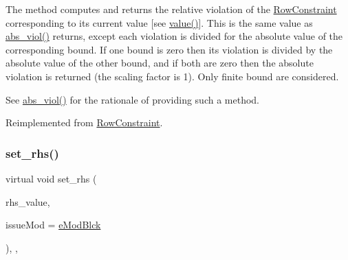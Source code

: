 The method computes and returns the relative violation of the \mbox{\hyperlink{class_s_m_spp__di__unipi__it_1_1_row_constraint}{Row\+Constraint}} corresponding to its current value \mbox{[}see \mbox{\hyperlink{class_s_m_spp__di__unipi__it_1_1_one_var_constraint_ad9256be16b98f3b557f54fa5e2118db7}{value()}}\mbox{]}. This is the same value as \mbox{\hyperlink{class_s_m_spp__di__unipi__it_1_1_u_b_constraint_a1e06e555eab5078e4d5ec16745778984}{abs\+\_\+viol()}} returns, except each violation is divided for the absolute value of the corresponding bound. If one bound is zero then its violation is divided by the absolute value of the other bound, and if both are zero then the absolute violation is returned (the scaling factor is 1). Only finite bound are considered.

See \mbox{\hyperlink{class_s_m_spp__di__unipi__it_1_1_u_b_constraint_a1e06e555eab5078e4d5ec16745778984}{abs\+\_\+viol()}} for the rationale of providing such a method. 

Reimplemented from \mbox{\hyperlink{class_s_m_spp__di__unipi__it_1_1_row_constraint_ab62e87cff922e3aa37b8a0b5644b4ecc}{Row\+Constraint}}.

\mbox{\label{class_s_m_spp__di__unipi__it_1_1_u_b_constraint_aaa68803a805a1bdf232c50aa56bb0807}} 
\subsubsection{\texorpdfstring{set\+\_\+rhs()}{set\_rhs()}}
{\footnotesize\ttfamily virtual void set\+\_\+rhs (\begin{DoxyParamCaption}\item[{\mbox{\hyperlink{class_s_m_spp__di__unipi__it_1_1_row_constraint_a34abd4b01d3a2024be5f6d13dd88779f}{c\+\_\+\+R\+H\+S\+Value}}}]{rhs\+\_\+value,  }\item[{\mbox{\hyperlink{group___modification___t_y_p_e_s_ga544246d8c462e9a2d817c2c30797968f}{c\+\_\+\+Mod\+Param}}}]{issue\+Mod = {\ttfamily \mbox{\hyperlink{group___modification___t_y_p_e_s_gga48fddcdd03a03f49b7e389ca1ed938d4a21b14b26b1c0093a0905f6fc010bad29}{e\+Mod\+Blck}}} }\end{DoxyParamCaption})\hspace{0.3cm}{\ttfamily [final]}, {\ttfamily [override]}, {\ttfamily [virtual]}}



